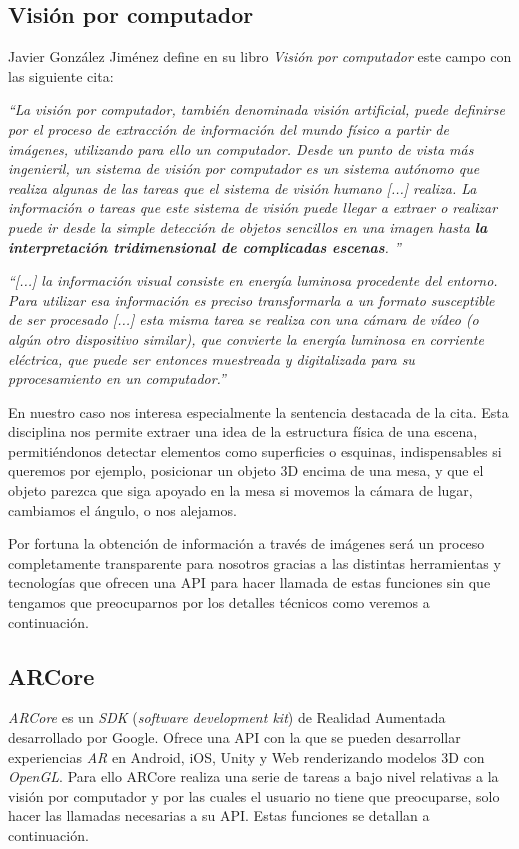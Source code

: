 \subsection{Visión por computador}
Javier González Jiménez define en su libro \textit{Visión por computador}\cite{visioncomputador} este campo con las siguiente cita:


    \textit{``La visión por computador, también denominada visión artificial, puede definirse por el proceso de extracción de información del mundo físico a partir de imágenes, utilizando para ello un computador. Desde un punto de vista más ingenieril, un sistema de visión por computador es un sistema autónomo que realiza algunas de las tareas que el sistema de visión humano [...] realiza. La información o tareas que este sistema de visión puede llegar a extraer o realizar puede ir desde la simple detección de objetos sencillos en una imagen hasta \textbf{la interpretación tridimensional de complicadas escenas}.
    ''}

    \textit{``[...] la información visual consiste en energía luminosa procedente del entorno. Para utilizar esa información es preciso transformarla a un formato susceptible de ser procesado [...] esta misma tarea se realiza con una cámara de vídeo (o algún otro dispositivo similar), que convierte la energía luminosa en corriente eléctrica, que puede ser entonces muestreada y digitalizada para su pprocesamiento en un computador.''}

En nuestro caso nos interesa especialmente la sentencia destacada de la cita. Esta disciplina nos permite extraer una idea de la estructura física de una escena, permitiéndonos detectar elementos como superficies o esquinas, indispensables si queremos por ejemplo, posicionar un objeto 3D encima de una mesa, y que el objeto parezca que siga apoyado en la mesa si movemos la cámara de lugar, cambiamos el ángulo, o nos alejamos.

Por fortuna la obtención de información a través de imágenes será un proceso completamente transparente para nosotros gracias a las distintas herramientas y tecnologías que ofrecen una API para hacer llamada de estas funciones sin que tengamos que preocuparnos por los detalles técnicos como veremos a continuación.

\subsection{ARCore}
\textit{ARCore}\cite{arcore}  es un \textit{SDK} (\textit{software development kit}) de Realidad Aumentada desarrollado por Google. Ofrece una API con la que se pueden desarrollar experiencias \textit{AR} en Android, iOS, Unity y Web renderizando modelos 3D con \textit{OpenGL}. Para ello ARCore realiza una serie de tareas a bajo nivel relativas a la visión por computador y por las cuales el usuario no tiene que preocuparse, solo hacer las llamadas necesarias a su API. Estas funciones se detallan a continuación.

